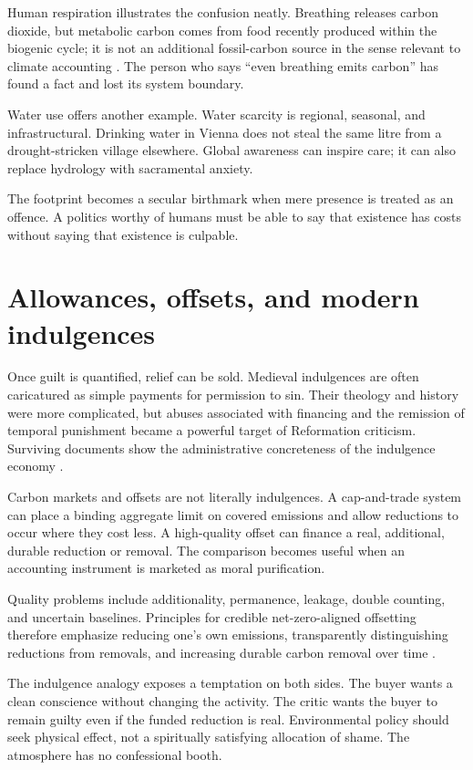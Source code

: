 \documentclass[12pt,a4paper]{book}
\begin{document}
Human respiration illustrates the confusion neatly.  Breathing releases
carbon dioxide, but metabolic carbon comes from food recently produced within
the biogenic cycle; it is not an additional fossil-carbon source in the sense
relevant to climate accounting \cite{MITBreathingCO2}.  The person who says
``even breathing emits carbon'' has found a fact and lost its system boundary.

Water use offers another example.  Water scarcity is regional, seasonal, and
infrastructural.  Drinking water in Vienna does not steal the same litre from
a drought-stricken village elsewhere.  Global awareness can inspire care; it
can also replace hydrology with sacramental anxiety.

The footprint becomes a secular birthmark when mere presence is treated as an
offence.  A politics worthy of humans must be able to say that existence has
costs without saying that existence is culpable.

\section{Allowances, offsets, and modern indulgences}

Once guilt is quantified, relief can be sold.  Medieval indulgences are often
caricatured as simple payments for permission to sin.  Their theology and
history were more complicated, but abuses associated with financing and the
remission of temporal punishment became a powerful target of Reformation
criticism.  Surviving documents show the administrative concreteness of the
indulgence economy \cite{EmoryIndulgence1515}.

Carbon markets and offsets are not literally indulgences.  A cap-and-trade
system can place a binding aggregate limit on covered emissions and allow
reductions to occur where they cost less.  A high-quality offset can finance a
real, additional, durable reduction or removal.  The comparison becomes useful
when an accounting instrument is marketed as moral purification.

Quality problems include additionality, permanence, leakage, double counting,
and uncertain baselines.  Principles for credible net-zero-aligned offsetting
therefore emphasize reducing one's own emissions, transparently distinguishing
reductions from removals, and increasing durable carbon removal over time
\cite{OxfordOffsettingPrinciples2024}.

The indulgence analogy exposes a temptation on both sides.  The buyer wants a
clean conscience without changing the activity.  The critic wants the buyer
to remain guilty even if the funded reduction is real.  Environmental policy
should seek physical effect, not a spiritually satisfying allocation of shame.
The atmosphere has no confessional booth.
\end{document}
